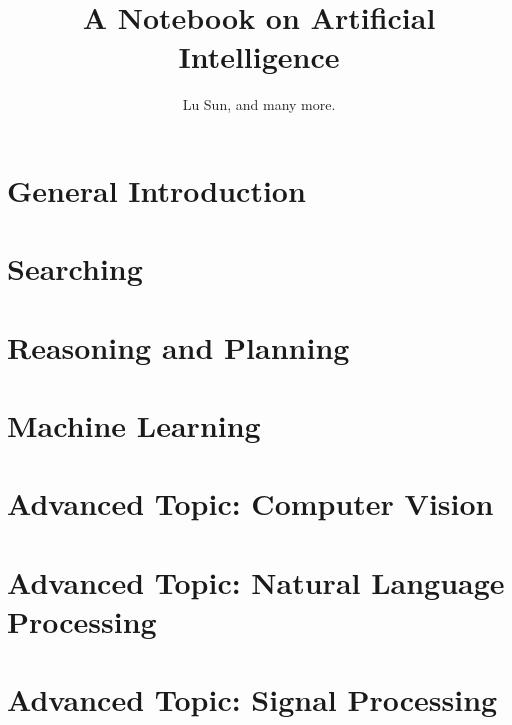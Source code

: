 



\makeindex



\frontmatter

\title{A Notebook on Artificial Intelligence}
\author{Lu Sun, and many more.}

\maketitle


\tableofcontents


\listoffigures
\listoftables

\mainmatter

\part{General Introduction}

\part{Searching}

\part{Reasoning and Planning}

\part{Machine Learning}

\part{Advanced Topic: Computer Vision}

\part{Advanced Topic: Natural Language Processing}

\part{Advanced Topic: Signal Processing}




\printindex


